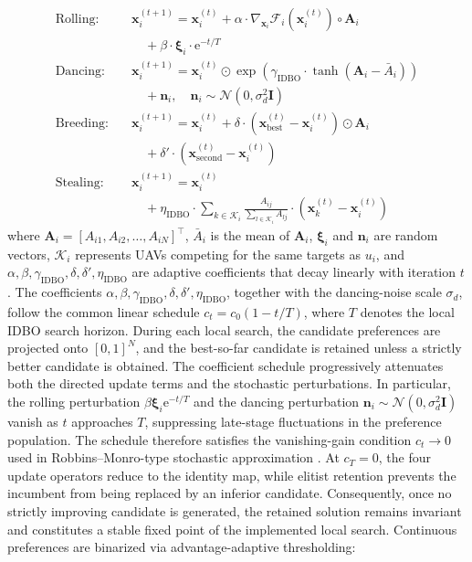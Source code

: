 \documentclass[lettersize,journal]{IEEEtran}
\newcommand{\hladd}[1]{{\color{blue}#1}}
\begin{document}
\begin{align}
\text{Rolling:} \quad & \mathbf{x}_i^{(t+1)} = \mathbf{x}_i^{(t)} + \alpha \cdot \nabla_{\mathbf{x}_i} \mathcal{F}_i(\mathbf{x}_i^{(t)}) \circ \mathbf{A}_i \nonumber \\
& \quad + \beta \cdot \boldsymbol{\xi}_i \cdot \mathrm{e}^{-t/T} \label{eq:rolling_update} \\
\text{Dancing:} \quad & \mathbf{x}_i^{(t+1)} = \mathbf{x}_i^{(t)} \odot \exp\left(\gamma_{\mathrm{IDBO}} \cdot \tanh(\mathbf{A}_i - \bar{A}_i)\right) \nonumber \\
& \quad + \mathbf{n}_i, \quad \mathbf{n}_i \sim \mathcal{N}(0, \sigma_d^2 \mathbf{I}) \label{eq:dancing_update} \\
\text{Breeding:} \quad & \mathbf{x}_i^{(t+1)} = \mathbf{x}_i^{(t)} + \delta \cdot \left(\mathbf{x}_{\text{best}}^{(t)} - \mathbf{x}_i^{(t)}\right) \odot \mathbf{A}_i \nonumber \\
& \quad + \delta' \cdot \left(\mathbf{x}_{\text{second}}^{(t)} - \mathbf{x}_i^{(t)}\right) \label{eq:breeding_update} \\
\text{Stealing:} \quad & \mathbf{x}_i^{(t+1)} = \mathbf{x}_i^{(t)} \nonumber \\
& \quad + \eta_{\mathrm{IDBO}} \cdot \sum_{k \in \mathcal{K}_i} \frac{A_{ij}}{\sum_{l \in \mathcal{K}_i} A_{lj}} \cdot \left(\mathbf{x}_k^{(t)} - \mathbf{x}_i^{(t)}\right) \label{eq:stealing_update}
\end{align}
where $\mathbf{A}_i = [A_{i1}, A_{i2}, \dots, A_{iN}]^\top$, $\bar{A}_i$ is the mean of $\mathbf{A}_i$, $\boldsymbol{\xi}_i$ and $\mathbf{n}_i$ are random vectors, $\mathcal{K}_i$ represents UAVs competing for the same targets as $u_i$, and $\alpha, \beta, \gamma_{\mathrm{IDBO}}, \delta, \delta', \eta_{\mathrm{IDBO}}$ are adaptive coefficients that decay linearly with iteration $t$. 
\hladd{The coefficients
$\alpha,\beta,\gamma_{\mathrm{IDBO}},\delta,\delta',
\eta_{\mathrm{IDBO}}$, together with the dancing-noise scale $\sigma_d$,
follow the common linear schedule $c_t=c_0(1-t/T)$, where $T$ denotes the
local IDBO search horizon. During each local search, the candidate
preferences are projected onto $[0,1]^N$, and the best-so-far candidate is
retained unless a strictly better candidate is obtained. The coefficient
schedule progressively attenuates both the directed update terms and the
stochastic perturbations. In particular, the rolling perturbation
$\beta\boldsymbol{\xi}_i\mathrm{e}^{-t/T}$ and the dancing perturbation
$\mathbf{n}_i\sim\mathcal{N}(0,\sigma_d^2\mathbf{I})$ vanish as $t$
approaches $T$, suppressing late-stage fluctuations in the preference
population. The schedule therefore satisfies the vanishing-gain condition
$c_t\to0$ used in Robbins--Monro-type stochastic approximation
\cite{robbins1951stochastic}. At $c_T=0$, the four update operators reduce
to the identity map, while elitist retention prevents the incumbent from
being replaced by an inferior candidate. Consequently, once no strictly
improving candidate is generated, the retained solution remains invariant
and constitutes a stable fixed point of the implemented local search.}
Continuous preferences are binarized via advantage-adaptive thresholding:
\end{document}
